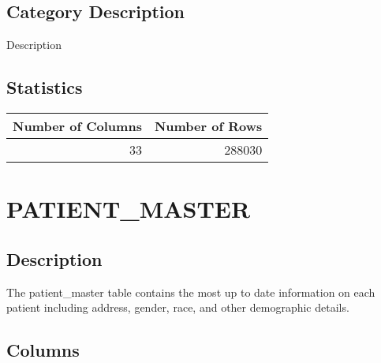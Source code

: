 \documentclass[
  letterpaper,
  DIV=11,
  numbers=noendperiod]{scrreprt}
\begin{document}
\hypertarget{category-description-26}{%
\section*{Category Description}\label{category-description-26}}

Description

\hypertarget{statistics-26}{%
\section*{Statistics}\label{statistics-26}}

\begin{longtable}{rr}
\toprule
Number of Columns & Number of Rows \\ 
\midrule
33 & 288030 \\ 
\bottomrule
\end{longtable}

\hypertarget{patient_master}{%
\chapter*{PATIENT\_MASTER}\label{patient_master}}

\hypertarget{description-27}{%
\section*{Description}\label{description-27}}

The patient\_master table contains the most up to date information on
each patient including address, gender, race, and other demographic
details.

\hypertarget{columns-27}{%
\section*{Columns}\label{columns-27}}
\end{document}
